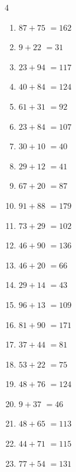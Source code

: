 \begin{multicols}{4}
\begin{enumerate}
  \item $87+75$
        $=162$

  \item $9+22$
        $=31$

  \item $23+94$
        $=117$

  \item $40+84$
        $=124$

  \item $61+31$
        $=92$

  \item $23+84$
        $=107$

  \item $30+10$
        $=40$

  \item $29+12$
        $=41$

  \item $67+20$
        $=87$

  \item $91+88$
        $=179$

  \item $73+29$
        $=102$

  \item $46+90$
        $=136$

  \item $46+20$
        $=66$

  \item $29+14$
        $=43$

  \item $96+13$
        $=109$

  \item $81+90$
        $=171$

  \item $37+44$
        $=81$

  \item $53+22$
        $=75$

  \item $48+76$
        $=124$

  \item $9+37$
        $=46$

  \item $48+65$
        $=113$

\columnbreak %

  \item $44+71$
        $=115$

  \item $77+54$
        $=131$


\end{enumerate}
\end{multicols}
